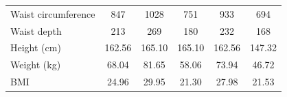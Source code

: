 \documentclass[12pt,a4paper,openany,UKenglish]{scrreprt}
\begin{document}
\begin{table}[H]
\begin{tabular}{lccccc}
		Waist circumference          & 847                                  & 1028       & 751        & 933        & 694        \\
		Waist depth                  & 213                                  & 269        & 180        & 232        & 168        \\
		\hline
		Height (cm)                  & 162.56                               & 165.10     & 165.10     & 162.56     & 147.32     \\
		Weight (kg)                  & 68.04                                & 81.65      & 58.06      & 73.94      & 46.72      \\
		BMI                          & 24.96                                & 29.95      & 21.30      & 27.98      & 21.53      \\
	\end{tabular}
\end{table}
\end{document}

